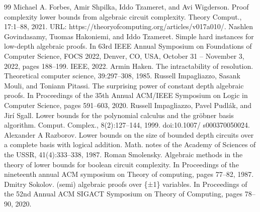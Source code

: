 \documentclass[10pt,a4paper]{article}
\begin{document}
\begin{thebibliography}{99}
 Michael A. Forbes, Amir Shpilka, Iddo Tzameret, and Avi Wigderson. Proof complexity lower bounds from algebraic circuit complexity. Theory Comput., 17:1–88, 2021. URL: https://theoryofcomputing.org/articles/v017a010/.
 Nashlen Govindasamy, Tuomas Hakoniemi, and Iddo Tzameret. Simple hard instances for low-depth algebraic proofs. In 63rd IEEE Annual Symposium on Foundations of Computer Science, FOCS 2022, Denver, CO, USA, October 31 – November 3, 2022, pages 188–199. IEEE, 2022.
 Armin Haken. The intractability of resolution. Theoretical computer science, 39:297–308, 1985.
 Russell Impagliazzo, Sasank Mouli, and Toniann Pitassi. The surprising power of constant depth algebraic proofs. In Proceedings of the 35th Annual ACM/IEEE Symposium on Logic in Computer Science, pages 591–603, 2020.
 Russell Impagliazzo, Pavel Pudlák, and Jirí Sgall. Lower bounds for the polynomial calculus and the gröbner basis algorithm. Comput. Complex., 8(2):127–144, 1999. doi:10.1007/ s000370050024.
 Alexander A Razborov. Lower bounds on the size of bounded depth circuits over a complete basis with logical addition. Math. notes of the Academy of Sciences of the USSR, 41(4):333–338, 1987.
 Roman Smolensky. Algebraic methods in the theory of lower bounds for boolean circuit complexity. In Proceedings of the nineteenth annual ACM symposium on Theory of computing, pages 77–82, 1987.
 Dmitry Sokolov. (semi) algebraic proofs over \{±1\} variables. In Proceedings of the 52nd Annual ACM SIGACT Symposium on Theory of Computing, pages 78–90, 2020.
\end{thebibliography}
\end{document}
